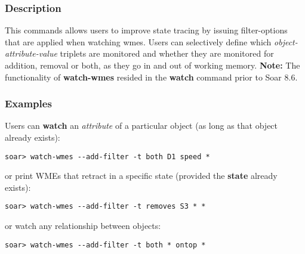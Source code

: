 \subsubsection*{Description}
 This commands allows users to improve state tracing by issuing filter-options that are applied when watching wmes. Users can selectively define which \emph{object-attribute-value}
 triplets are monitored and whether they are monitored for addition, removal or both, as they go in and out of working memory. 
 \textbf{Note:}
 The functionality of \textbf{watch-wmes}
 resided in the \textbf{watch}
 command prior to Soar 8.6. 
\subsubsection*{Examples}
 Users can \textbf{watch}
 an \emph{attribute}
 of a particular object (as long as that object already exists):  \begin{verbatim}
soar> watch-wmes --add-filter -t both D1 speed *
\end{verbatim}
 or print WMEs that retract in a specific state (provided the \textbf{state}
 already exists):  \begin{verbatim}
soar> watch-wmes --add-filter -t removes S3 * *
\end{verbatim}
  or watch any relationship between objects:  \begin{verbatim}
soar> watch-wmes --add-filter -t both * ontop *
\end{verbatim}

